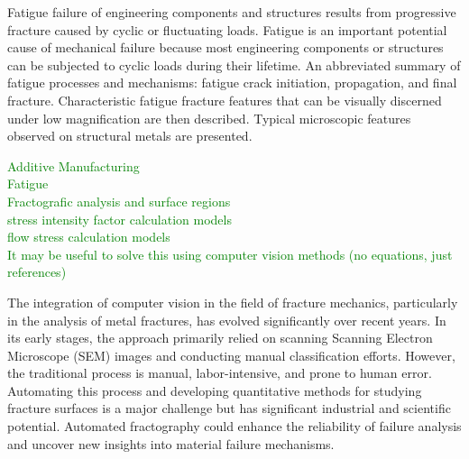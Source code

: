\documentclass[preprint,12pt]{elsarticle}
\begin{document}
Fatigue failure of engineering components and structures results from progressive fracture caused by cyclic or fluctuating loads. Fatigue is an important potential cause of mechanical failure because most engineering components or structures can be subjected to cyclic loads during their lifetime.
An abbreviated summary of fatigue processes and mechanisms: fatigue crack initiation, propagation, and final fracture. Characteristic fatigue fracture features that can be visually discerned under low magnification are then described.
Typical microscopic features observed on structural metals are presented.

\textcolor{green}{Additive Manufacturing\\Fatigue\\Fractografic analysis and surface regions\\stress intensity factor calculation models\\flow stress calculation models\\It may be useful to solve this using computer vision methods  (no equations, just references)}




    The integration of computer vision in the field of fracture mechanics, particularly in the analysis of metal fractures, has evolved significantly over recent years.
    In its early stages, the approach primarily relied on scanning Scanning Electron Microscope (SEM) images and conducting manual classification efforts.
    However, the traditional process is manual, labor-intensive, and prone to human error.
    Automating this process and developing quantitative methods for studying fracture surfaces is a major challenge but has significant industrial and scientific potential.
    Automated fractography could enhance the reliability of failure analysis and uncover new insights into material failure mechanisms.
\end{document}
